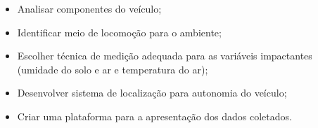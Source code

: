 \begin{itemize}	
	\item Analisar componentes do veículo;
	\item Identificar meio de locomoção para o ambiente;
	\item Escolher técnica de medição adequada para as variáveis impactantes (umidade do solo e ar e temperatura do ar);
	\item Desenvolver sistema de localização para autonomia do veículo;
	\item Criar uma plataforma para a apresentação dos dados coletados.
\end{itemize}

